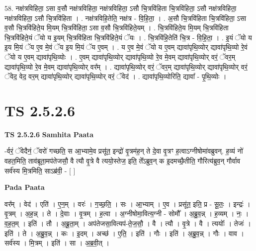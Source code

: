 \documentclass[17pt]{extarticle}
\begin{document}
58. नक्ष॑त्रविहिता॒ ऽसा व॒सौ नक्ष॑त्रविहिता॒ नक्ष॑त्रविहिता॒ ऽसौ चि॒त्रवि॑हिता चि॒त्रवि॑हिता॒ ऽसौ नक्ष॑त्रविहिता॒ नक्ष॑त्रविहिता॒ ऽसौ चि॒त्रवि॑हिता । . नक्ष॑त्रविहि॒तेति॒ नक्ष॑त्र - वि॒हि॒ता॒ । . अ॒सौ चि॒त्रवि॑हिता चि॒त्रवि॑हिता॒ ऽसा व॒सौ चि॒त्रवि॑हिते॒य मि॒यम् चि॒त्रवि॑हिता॒ ऽसा व॒सौ चि॒त्रवि॑हिते॒यम् । . चि॒त्रवि॑हिते॒य मि॒यम् चि॒त्रवि॑हिता चि॒त्रवि॑हिते॒यं ॅयो य इ॒यम् चि॒त्रवि॑हिता चि॒त्रवि॑हिते॒यं ॅयः । . चि॒त्रवि॑हि॒तेति॑ चि॒त्र - वि॒हि॒ता॒ । . इ॒यं ॅयो य इ॒य मि॒यं ॅय ए॒व मे॒वं ॅय इ॒य मि॒यं ॅय ए॒वम् । . य ए॒व मे॒वं ॅयो य ए॒वम् द्यावा॑पृथि॒व्योर् द्यावा॑पृथि॒व्यो रे॒वं ॅयो य ए॒वम् द्यावा॑पृथि॒व्योः । . ए॒वम् द्यावा॑पृथि॒व्योर् द्यावा॑पृथि॒व्यो रे॒व मे॒वम् द्यावा॑पृथि॒व्योर् वरं॒ ॅवर॒म् द्यावा॑पृथि॒व्यो रे॒व मे॒वम् द्यावा॑पृथि॒व्योर् वर᳚म् । . द्यावा॑पृथि॒व्योर् वरं॒ ॅवर॒म् द्यावा॑पृथि॒व्योर् द्यावा॑पृथि॒व्योर् वरं॒ ॅवेद॒ वेद॒ वर॒म् द्यावा॑पृथि॒व्योर् द्यावा॑पृथि॒व्योर् वरं॒ ॅवेद॑ । . द्यावा॑पृथि॒व्योरिति॒ द्यावा᳚ - पृ॒थि॒व्योः । \newline
\pagebreak
{}
\section*{ TS 2.5.2.6 }

\textbf{TS 2.5.2.6 } \newline
\textbf{Samhita Paata} \newline

-र्वरं॒ ॅवेदैनं॒ ॅवरो॑ गच्छति॒ स आ॒भ्यामे॒व प्रसू॑त॒ इन्द्रो॑ वृ॒त्रम॑ह॒न् ते दे॒वा वृ॒त्रꣳ ह॒त्वाऽग्नीषोमा॑वब्रुवन्. ह॒व्यं नो॑ वहत॒मिति॒ ताव॑ब्रूता॒मप॑तेजसौ॒ वै त्यौ वृ॒त्रे वै त्ययो॒स्तेज॒ इति॒ ते᳚ऽब्रुव॒न् क इ॒दमच्छै॒तीति॒ गौरित्य॑ब्रुव॒न् गौर्वाव सर्व॑स्य मि॒त्रमिति॒ साऽब्र॑वी॒ - [  ] \newline

\textbf{Pada Paata} \newline

वर᳚म् । वेद॑ । एति॑ । ए॒न॒म् । वरः॑ । ग॒च्छ॒ति॒ । सः । आ॒भ्याम् । ए॒व । प्रसू॑त॒ इति॒ प्र - सू॒तः॒ । इन्द्रः॑ । वृ॒त्रम् । अ॒ह॒न्न् । ते । दे॒वाः । वृ॒त्रम् । ह॒त्वा । अ॒ग्नीषोमा॒वित्य॒ग्नी - सोमौ᳚ । अ॒ब्रु॒व॒न्न् । ह॒व्यम् । नः॒ । व॒ह॒त॒म् । इति॑ । तौ । अ॒ब्रू॒ता॒म् । अप॑तेजसा॒वित्यप॑-ते॒ज॒सौ॒ । वै । त्यौ । वृ॒त्रे । वै । त्ययोः᳚ । तेजः॑ । इति॑ । ते । अ॒ब्रु॒व॒न्न् । कः । इ॒दम् । अच्छ॑ । ए॒ति॒ । इति॑ । गौः । इति॑ । अ॒ब्रु॒व॒न्न् । गौः । वाव । सर्व॑स्य । मि॒त्रम् । इति॑ । सा । अ॒ब्र॒वी॒त् ।  \newline
\end{document}
